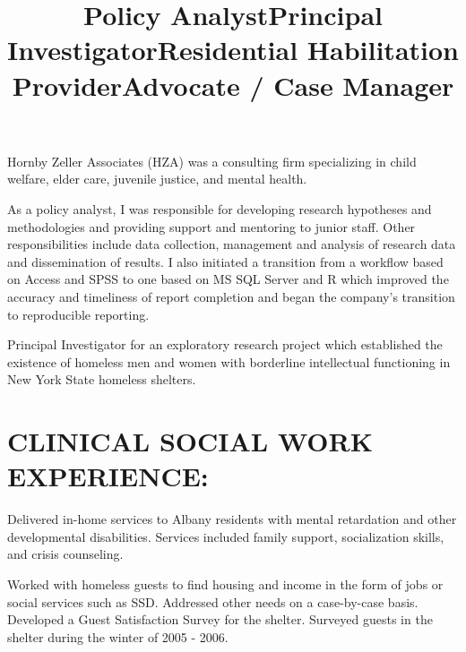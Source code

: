 \documentclass[line, mm, 10pt]{res}
\begin{document}
\begin{resume}
  \title{Policy Analyst}
  \begin{position}
    Hornby Zeller Associates (HZA) was a consulting firm specializing in child
    welfare, elder care, juvenile justice, and mental health. 
    
    As a policy analyst, I was responsible for developing research hypotheses
    and methodologies and providing support and mentoring to junior staff. Other
    responsibilities include data collection, management and analysis of
    research data and dissemination of results. I also initiated a transition
    from a workflow based on Access and SPSS to one based on MS SQL Server and R
    which improved the accuracy and timeliness of report completion and began
    the company's transition to reproducible reporting.
  \end{position}

  \title{Principal Investigator}
  \begin{position}
    Principal Investigator for an exploratory research project which
    established the existence of homeless men and women with
    borderline intellectual functioning in New York State homeless
    shelters.
  \end{position}


  \section{CLINICAL SOCIAL WORK EXPERIENCE:}

  \title{Residential Habilitation Provider}
  \begin{position}
    Delivered in-home services to Albany residents with mental
    retardation and other developmental disabilities. Services included
    family support, socialization skills, and crisis counseling.
  \end{position}

  \title{Advocate / Case Manager}
  \begin{position}
    Worked with homeless guests to find housing and income in the form of jobs
    or social services such as SSD. Addressed other needs on a case-by-case
    basis. Developed a Guest Satisfaction Survey for the shelter. Surveyed
    guests in the shelter during the winter of 2005 - 2006.
  \end{position}


\end{resume}
\end{document}
